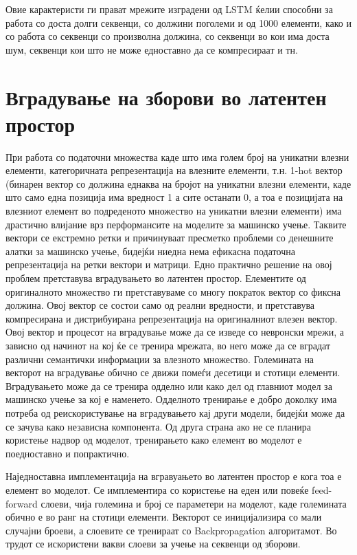Овие карактеристи ги прават мрежите изградени од LSTM ќелии способни за работа со доста долги секвенци, со должини поголеми и од 1000 елементи, како и со работа со секвенци со произволна должина, со секвенци во кои има доста шум, секвенци кои што не може едноставно да се компресираат и тн.

\section{Вградување на зборови во латентен простор}

При работа со податочни множества каде што има голем број на уникатни влезни елементи, категоричната репрезентација на влезните елементи, т.н. 1-hot вектор (бинарен вектор со должина еднаква на бројот на уникатни влезни елементи, каде што само една позиција има вредност 1 а сите останати 0, а тоа е позицијата на влезниот елемент во подреденото множество на уникатни влезни елементи) има драстично влијание врз перформансите на моделите за машинско учење. Таквите вектори се екстремно ретки и причинуваат пресметко проблеми со денешните алатки за машинско учење, бидејќи ниедна нема ефикасна податочна репрезентација на ретки вектори и матрици. 
Едно практично решение на овој проблем претставува вградувањето во латентен простор. Елементите од оригиналното множество ги претставуваме со многу пократок вектор со фиксна должина. Овој вектор се состои само од реални вредности, и претставува компресирана и дистрибуирана репрезентација на оригиналниот влезен вектор. Овој вектор и процесот на вградување може да се изведе со невронски мрежи, а зависно од начинот на кој ќе се тренира мрежата, во него може да се вградат различни семантички информации за влезното множество. Големината на векторот на вградување обично се движи помеѓи десетици и стотици елементи.
Вградувањето може да се тренира одделно или како дел од главниот модел за машинско учење за кој е наменето. Одделното тренирање е добро доколку има потреба од реискористување на вградувањето кај други модели, бидејќи може да се зачува како независна компонента. Од друга страна ако не се планира користење надвор од моделот, тренирањето како елемент во моделот е поедноставно и попрактично.

Наједноставна имплементација на вгравуањето во латентен простор е кога тоа е елемент во моделот. Се имплементира со користење на еден или повеќе feed-forward слоеви, чија големина и број се параметери на моделот, каде големината обично е во ранг на стотици елементи. Векторот се иницијализира со мали случајни броеви, а слоевите се тренираат со Backpropagation алгоритамот. Во трудот \cite{Sutskever2014} се искористени вакви слоеви за учење на секвенци од зборови. 

